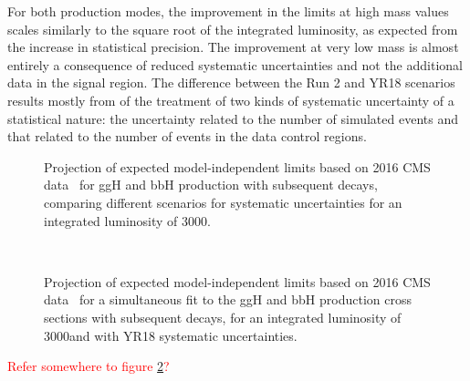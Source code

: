 For both production modes, 
the improvement in the limits at high mass values
scales similarly to the square root of the integrated luminosity,
as expected from the increase in statistical precision.
The improvement at very low mass is almost entirely a consequence of reduced systematic uncertainties
and not the additional data in the signal region. 
The difference between the Run 2 and YR18 scenarios results mostly from of the treatment 
of two kinds of systematic uncertainty of a statistical nature: 
the uncertainty related to the number of simulated events 
and that related to the number 
of events in the data control regions.
%
\begin{figure}[htbp]
\begin{center}
\end{center}
\caption{Projection of expected model-independent limits based on 2016 CMS data~\cite{HIG-17-020} 
for ggH and bbH production with subsequent \htt decays, comparing different 
scenarios for systematic uncertainties for an integrated luminosity of 3000\fbinv.}
\label{fig:model_indep2}
\end{figure}

\begin{figure}[htbp]
\begin{center}
\\
\end{center}
\caption{Projection of expected model-independent limits based on 2016 CMS data~\cite{HIG-17-020} for a simultaneous fit to the ggH and bbH production cross sections with subsequent \htt decays, 
for an integrated luminosity of 3000\fbinv and with YR18 systematic uncertainties.}
\label{fig:model_indep2d}
\end{figure}

\textcolor{red}{Refer somewhere to figure \ref{fig:model_indep2d}?}
